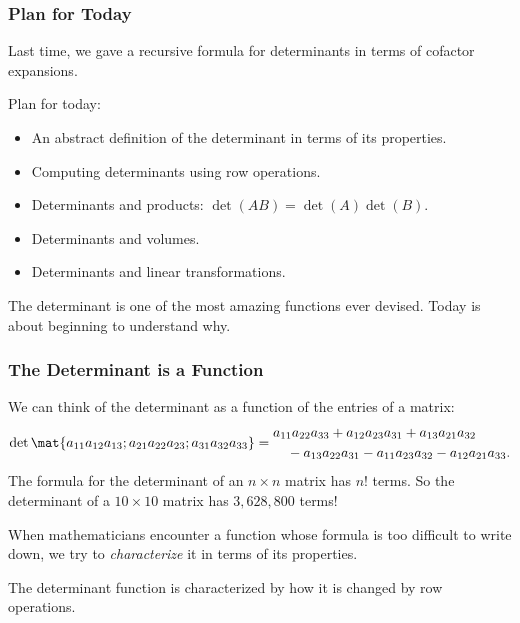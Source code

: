 
\usetikzlibrary{decorations.pathreplacing}




\begin{frame}
\frametitle{Plan for Today}

Last time, we gave a recursive formula for determinants in terms of cofactor
expansions.

\pause\bigskip
\alert{Plan for today:}
\begin{itemize}
\item An abstract definition of the determinant in terms of its properties.
\pause
\item Computing determinants using row operations.
\pause
\item Determinants and products: $\det(AB) = \det(A)\det(B)$.
\pause
\item Determinants and volumes.
\pause
\item Determinants and linear transformations.
\end{itemize}

\pause\bigskip
The determinant is one of the most amazing functions ever devised.  Today is
about beginning to understand why.

\end{frame}



\begin{frame}
\frametitle{The Determinant is a Function}

We can think of the determinant as a function of the entries of a matrix:
\[ \det\mat{a_{11} a_{12} a_{13}; a_{21} a_{22} a_{23}; a_{31} a_{32} a_{33}}
= \begin{aligned}
& a_{11}a_{22}a_{33} + a_{12}a_{23}a_{31} + a_{13}a_{21}a_{32} \\
&\quad -a_{13}a_{22}a_{31} - a_{11}a_{23}a_{32} - a_{12}a_{21}a_{33}.
\end{aligned} \]
\pause
The formula for the determinant of an $n\times n$ matrix has $n!$ terms.
\pause
So the determinant of a $10\times 10$ matrix has $3{,}628{,}800$ terms!

\pause\bigskip
When mathematicians encounter a function whose formula is too difficult to write
down, we try to \emph{characterize} it in terms of its properties.

\pause\bigskip
The determinant function is characterized by how it is changed by row
operations.

\end{frame}


